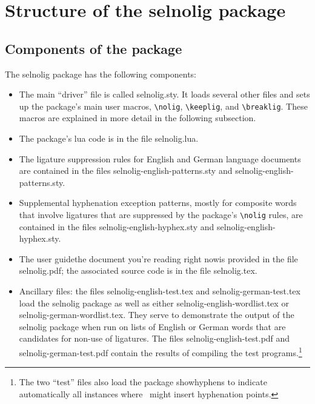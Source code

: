 \documentclass[11pt]{article}
\newcommand{\pkg}[1]{\textsf{#1}}
\newcommand{\cmmd}[1]{\texttt{\textbackslash #1}}
\begin{document}
\section[Structure of the selnolig package]{Structure of the \pkg{selnolig} package}

\subsection{Components of the package}

The \pkg{selnolig} package has the following components:
\begin{itemize}
\item The main \enquote{driver} file is called \pkg{selnolig.sty}. It loads several other files and sets up the package's main user macros, \cmmd{nolig}, \cmmd{keeplig}, and \cmmd{breaklig}. These macros are explained in more detail in the following subsection.
\item The package's lua code is in the file \pkg{selnolig.lua}. 
\item The ligature suppression rules for English and German language documents are contained in the files \pkg{selnolig-english-patterns.sty} and \pkg{selnolig-english-patterns.sty}. 
\item Supplemental hyphenation exception patterns, mostly for composite words that involve ligatures that are  suppressed by the package's \cmmd{nolig} rules, are contained in the files \pkg{selnolig-english-hyphex.sty} and \pkg{selnolig-english-hyphex.sty}.
\item The user guide\textemdash the document you're reading right now\textemdash is provided in the file \pkg{selnolig.pdf}; the associated source code is in the file \pkg{selnolig.tex}. 
\item Ancillary files: the files \pkg{selnolig-english-test.tex} and \pkg{selnolig-german-test.tex} load the \pkg{selnolig} package as well as either \pkg{selnolig-english-wordlist.tex} or \pkg{selnolig-german-wordlist.tex}. They serve to demonstrate the output of the \pkg{selnolig} package when run on lists of English or German words that are candidates for non-use of ligatures. The files \pkg{selnolig-english-test.pdf} and \pkg{selnolig-german-test.pdf} contain the results of compiling the test programs.\footnote{The two \enquote{test} files also load the package \pkg{showhyphens} to indicate automatically all instances where \LuaLaTeX\ might insert hyphenation points.}

\end{itemize}
\end{document}
